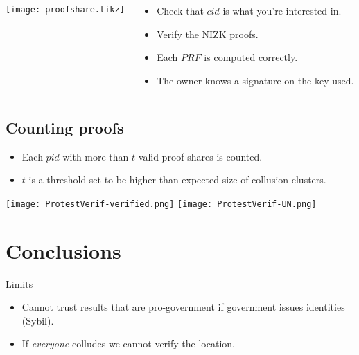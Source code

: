 \begin{frame}
  \begin{columns}
    \begin{column}{0.5\linewidth}
      \tiny
      \texttt{[image: proofshare.tikz]}
    \end{column}

    \begin{column}{0.5\linewidth}
      \begin{itemize}
        \item Check that \(cid\) is what you're interested in.
        \item Verify the \ac{NIZK} proofs.
        \item Each \(PRF\) is computed correctly.
        \item The owner knows a signature on the key used.
      \end{itemize}
    \end{column}
  \end{columns}
\end{frame}

\subsection{Counting proofs}

\begin{frame}
  \begin{itemize}
    \item Each \(pid\) with more than \(t\) valid proof shares is counted.
    \item \(t\) is a threshold set to be higher than expected size of collusion 
      clusters.
  \end{itemize}
\end{frame}

\begin{frame}
  \centering
  \texttt{[image: ProtestVerif-verified.png]}
  \texttt{[image: ProtestVerif-UN.png]}
\end{frame}


\section{Conclusions}

\begin{frame}
  \begin{alertblock}{Limits}
    \begin{itemize}
      \item Cannot trust results that are pro-government if government issues 
        identities (Sybil).

        \pause{}

      \item If \emph{everyone} colludes we cannot verify the location.
    \end{itemize}
  \end{alertblock}
\end{frame}
